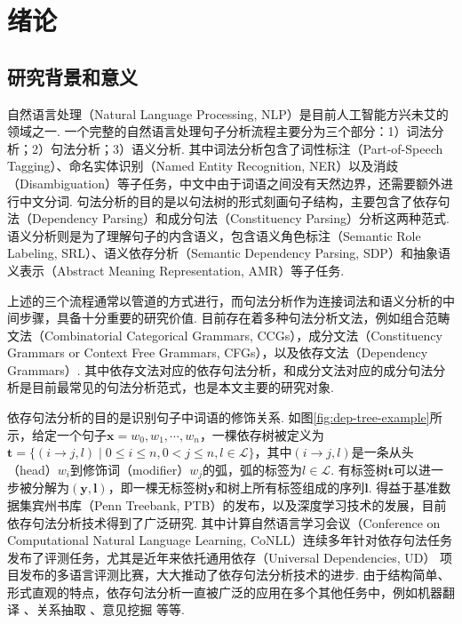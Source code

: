 \chapter{绪论}
\label{cha:intro}

\section{研究背景和意义}

自然语言处理（Natural Language Processing, NLP）是目前人工智能方兴未艾的领域之一.
一个完整的自然语言处理句子分析流程主要分为三个部分：1）词法分析；2）句法分析；3）语义分析.
其中词法分析包含了词性标注（Part-of-Speech Tagging）、命名实体识别（Named Entity Recognition, NER）以及消歧（Disambiguation）等子任务，中文中由于词语之间没有天然边界，还需要额外进行中文分词.
句法分析的目的是以句法树的形式刻画句子结构，主要包含了依存句法（Dependency Parsing）和成分句法（Constituency Parsing）分析这两种范式.
语义分析则是为了理解句子的内含语义，包含语义角色标注（Semantic Role Labeling, SRL）、语义依存分析（Semantic Dependency Parsing, SDP）和抽象语义表示（Abstract Meaning Representation, AMR）等子任务.

上述的三个流程通常以管道的方式进行，而句法分析作为连接词法和语义分析的中间步骤，具备十分重要的研究价值.
目前存在着多种句法分析文法，例如组合范畴文法（Combinatorial Categorical Grammars, CCGs），成分文法（Constituency Grammars or Context Free Grammars, CFGs），以及依存文法（Dependency Grammars）.
其中依存文法对应的依存句法分析，和成分文法对应的成分句法分析是目前最常见的句法分析范式，也是本文主要的研究对象.


依存句法分析的目的是识别句子中词语的修饰关系.
如图\ref{fig:dep-tree-example}所示，给定一个句子$\boldsymbol{x}=w_0,w_1,\cdots,w_n$，一棵依存树被定义为$\boldsymbol{t}=\{(i\rightarrow j,l)\mid 0\le i \le n,0 < j \le n,l \in \mathcal{L}\}$，其中$(i\rightarrow j,l)$是一条从头（head）$w_i$到修饰词（modifier）$w_j$的弧，弧的标签为$l \in \mathcal{L}$.
有标签树$\boldsymbol{t}$可以进一步被分解为$(\boldsymbol{y},\boldsymbol{l})$，即一棵无标签树$\boldsymbol{y}$和树上所有标签组成的序列$\boldsymbol{l}$.
得益于基准数据集宾州书库（Penn Treebank, PTB）的发布，以及深度学习技术的发展，目前依存句法分析技术得到了广泛研究.
其中计算自然语言学习会议（Conference on Computational Natural Language Learning, CoNLL）连续多年针对依存句法任务发布了评测任务，尤其是近年来依托通用依存（Universal Dependencies, UD） \citep{nivre-etal-2017-universal}项目发布的多语言评测比赛，大大推动了依存句法分析技术的进步.
由于结构简单、形式直观的特点，依存句法分析一直被广泛的应用在多个其他任务中，例如机器翻译 \citep{zhang-etal-2019-syntax}、关系抽取 \citep{song-etal-2019-leveraging}、意见挖掘 \citep{zhang-etal-2020-syntax}等等.

